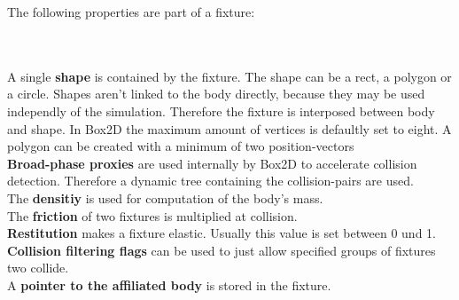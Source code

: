 \documentclass[10pt,a4paper,DIV=11]{scrreprt}
\begin{document}
The following properties are part of a fixture:


   \\
\\

A single \textbf{shape} is contained by the fixture. The shape can be a rect, a polygon or a circle. Shapes aren't linked to the body directly, because they may be used independly of the simulation. Therefore the fixture is interposed between body and shape. In Box2D the maximum amount of vertices is defaultly set to eight. A polygon can be created with a minimum of two position-vectors
\\

\textbf{Broad-phase proxies} are used internally by Box2D to accelerate collision detection. Therefore a dynamic tree containing the collision-pairs are used. \\
 
The \textbf{densitiy} is used for computation of the body's mass.\\

The \textbf{friction} of two fixtures is multiplied at collision. \\

\textbf{Restitution} makes a fixture elastic. Usually this value is set between 0 und 1. \\

\textbf{Collision filtering flags} can be used to just allow specified groups of fixtures two collide. \\

A \textbf{pointer to the affiliated body} is stored in the fixture.\\
\end{document}
